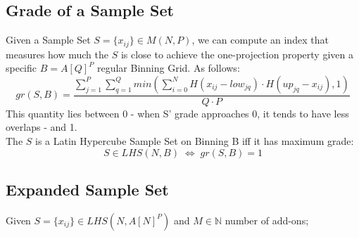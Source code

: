 \documentclass{article}
\begin{document}
\subsection{Grade of a Sample Set}
Given a Sample Set $S = \{x_{ij}\} \in M(N, P)$, we can compute an index that measures how much the $S$ is close to achieve the one-projection property given a specific $B = A[Q]^P$ regular Binning Grid. As follows:
\begin{equation}
gr(S, B) = \frac{\sum^P_{j=1}\sum^Q_{q=1}min(\sum^N_{i=0} H(x_{ij} - low_{jq}) \cdot H(up_{jq} - x_{ij}), 1)}{Q \cdot P}
\end{equation}
This quantity lies between 0 - when S' grade approaches 0, it tends to have less overlaps - and 1.\\
The $S$ is a Latin Hypercube Sample Set on Binning B iff it has maximum grade: 
\begin{equation}
S \in LHS(N, B) \;\Leftrightarrow\; gr(S, B) = 1
\end{equation}

\subsection{Expanded Sample Set}
Given $S = \{x_{ij}\} \in LHS(N, A[N]^P)$ and $M \in \mathbb{N}$ number of add-ons;
\end{document}
